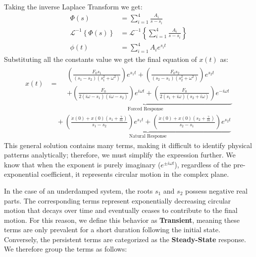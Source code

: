 \documentclass[10pt,twoside]{report}
\begin{document}
Taking the inverse Laplace Transform we get:
\begin{align*}
    \Phi(s) &= \sum_{i=1}^{4} \frac{A_i}{s - s_i} \\[10pt]
    \mathcal{L}^{-1} \left\{ \Phi(s) \right\} &= \mathcal{L}^{-1} \left\{ \sum_{i=1}^{4} \frac{A_i}{s - s_i} \right\} \\[10pt]
    \phi(t) &= \sum_{i=1}^{4} A_i e^{s_i t}
\end{align*}
Substituting all the constants value we get the final equation of $x(t)$ as:
\begin{equation}
\label{eq:Forced harmonic sol}
\begin{split}
    x(t) &= \underbrace{
        \begin{aligned}
            &\left(\frac{F_0 s_1}{(s_1 - s_2)(s_1^2 + \omega^2)}\right)e^{s_1t} + \left(\frac{F_0 s_2}{(s_2 - s_1)(s_2^2 + \omega^2)}\right)e^{s_2t} \\
            &+ \left(\frac{F_0}{2(i\omega - s_1)(i\omega - s_2)}\right)e^{i\omega t} + \left(\frac{F_0}{2(s_1 + i\omega)(s_2 + i\omega)}\right)e^{-i\omega t}
        \end{aligned}
    }_{\text{Forced Response}} \\[15pt]
    &\quad + \underbrace{
        \left( \frac{\dot{x}(0) + x(0) ( s_1 + \frac{\gamma}{m} )}{s_1 - s_2} \right) e^{s_1 t} + \left( \frac{\dot{x}(0) + x(0) ( s_2 + \frac{\gamma}{m} )}{s_2 - s_1} \right) e^{s_2 t}
    }_{\text{Natural Response}}
\end{split}
\end{equation}
This general solution contains many terms, making it difficult to identify physical patterns analytically; therefore, we must simplify the expression further. We know that when the exponent is purely imaginary ($e^{\pm i\omega t}$), regardless of the pre-exponential coefficient, it represents circular motion in the complex plane. 

In the case of an underdamped system, the roots $s_1$ and $s_2$ possess negative real parts. The corresponding terms represent exponentially decreasing circular motion that decays over time and eventually ceases to contribute to the final motion. For this reason, we define this behavior as \textbf{Transient}, meaning these terms are only prevalent for a short duration following the initial state. Conversely, the persistent terms are categorized as the \textbf{Steady-State} response. We therefore group the terms as follows:
\end{document}

